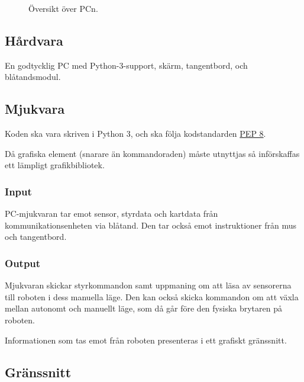 \documentclass[a4paper,11pt]{article}
\begin{document}
\begin{figure}[h!]
    \caption{Översikt över PCn.}
    \label{fig:modules}
\end{figure}
\subsection{Hårdvara}
En godtycklig PC med Python-3-support, skärm, tangentbord, och blåtandsmodul.

\subsection{Mjukvara}

Koden ska vara skriven i Python 3, och ska följa kodstandarden \href{https://www.python.org/dev/peps/pep-0008/}{PEP 8}.

Då grafiska element (snarare än kommandoraden) måste utnyttjas så införskaffas ett lämpligt grafikbibliotek.

\subsubsection{Input}
PC-mjukvaran tar emot sensor, styrdata och kartdata från kommunikationsenheten via blåtand. Den tar också emot instruktioner från mus och tangentbord. 

\subsubsection{Output}
Mjukvaran skickar styrkommandon samt uppmaning om att läsa av sensorerna till roboten i dess manuella läge. Den kan också skicka kommandon om att växla mellan autonomt och manuellt läge, som då går före den fysiska brytaren på roboten.

Informationen som tas emot från roboten presenteras i ett grafiskt gränssnitt.

\subsection{Gränssnitt} \label{ssec:PCInterface}
\end{document}
